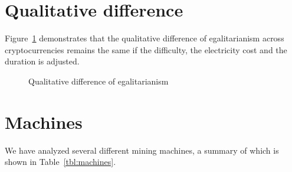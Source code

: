 \appendix
\section{Qualitative difference}\label{sec:appendix-qualitative-difference}

Figure~\ref{fig:different-settings} demonstrates that the qualitative difference of egalitarianism across cryptocurrencies remains the same if the difficulty, the electricity cost and the duration is adjusted.

\begin{figure}
  \caption{Qualitative difference of egalitarianism}
  \label{fig:different-settings}
\end{figure}

\section{Machines}\label{sec:appendix-data}

We have analyzed several different mining machines, a summary of which is shown in Table~\ref{tbl:machines}.


